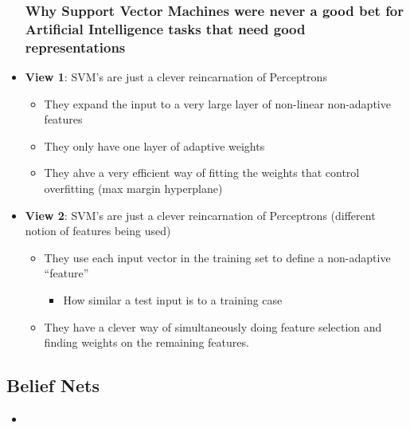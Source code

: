 \begin{itemize}
	\subsubsection{Why Support Vector Machines were never a good bet for Artificial Intelligence tasks that need good representations}
	\item \textbf{View 1}: SVM's are just a clever reincarnation of Perceptrons
	\begin{itemize}
		\item They expand the input to a very large layer of non-linear non-adaptive features 
		\item They only have one layer of adaptive weights 
		\item They ahve a very efficient way of fitting the weights that control overfitting (max margin hyperplane)
	\end{itemize}
	\item \textbf{View 2}: SVM's are just a clever reincarnation of Perceptrons (different notion of features being used)
	\begin{itemize}
		\item They use each input vector in the training set to define a non-adaptive ``feature''
		\begin{itemize}
			\item How similar a test input is to a training case
		\end{itemize}
		\item They have a clever way of simultaneously doing feature selection and finding weights on the remaining features.
	\end{itemize}
\end{itemize}

\subsection{Belief Nets}
\begin{itemize}
	\item 
\end{itemize}